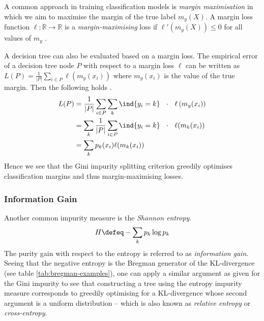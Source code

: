 \documentclass[../main.tex]{subfiles}
\begin{document}
A common approach in training classification models
is \textit{margin maximisation} \cite{schapire_BoostingFoundationsAlgorithms_2012}
in which we aim to maximise the margin of the true label $m_{y}(X)$. 
A margin loss function $\ell : \mathbb{R} \to \mathbb{R}$ is a \textit{margin-maximising} loss if $\ell'(m_{y}(X)) \leq 0$ for all values of $m_{y}$ \cite{leistner_SemiSupervisedRandomForests_2009}.

%
A decision tree can also be evaluated based on a margin loss.
The empirical error of a decision tree node $P$ with respect to a margin loss $\ell$ can be written as $L(P) = \frac{1}{|P|} \sum_{i \in P} \ell\left(m_{y}(x_{i})\right)$ where $m_{y}(x_{i})$ is the value of the true margin. Then the following holds \cite{leistner_SemiSupervisedRandomForests_2009}.
\begin{align*}
L(P) &= \frac{1}{|P|}\sum_{i \in P} \sum_{k} \ind{y_{i}=k} ~ ~ \cdot ~ ~  \ell   \left( m_y(x_i) \right)  \\
&= \sum_{k}  
\frac{1}{|P|} \sum_{i \in P} \ind{y_{i}=k}
~ ~ \cdot ~ ~ 
\ell(m_{k}(x_{i})) \\
&= \sum_k p_k(x_i) \ell(m_k(x_i))
\end{align*}
Hence we see that the Gini impurity splitting criterion greedily optimises classification margins and thus margin-maximising losses.

\subsubsection{Information Gain}

Another common impurity measure is the \textit{Shannon entropy}. 
$$
H \defeq -\sum_{k} p_{k} \log p_{k}
$$
The purity gain with respect to the entropy is referred to as \textit{information gain}.
Seeing that the negative entropy is the Bregman generator of the KL-divergence (see table \ref{tab:bregman-examples}), one can apply a similar argument as given for the Gini impurity to see that constructing a tree using the entropy impurity measure corresponds to greedily optimising for a KL-divergence whose second argument is a uniform distribution -- which is also known as \textit{relative entropy} or \textit{cross-entropy}.
\end{document}
